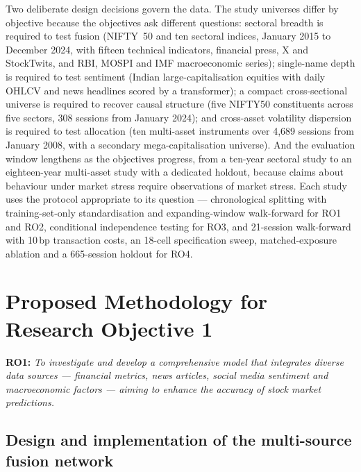 Two deliberate design decisions govern the data. The study universes differ by objective
because the objectives ask different questions: sectoral breadth is required to test fusion
(NIFTY~50 and ten sectoral indices, January 2015 to December 2024, with fifteen technical
indicators, financial press, X and StockTwits, and RBI, MOSPI and IMF macroeconomic series);
single-name depth is required to test sentiment (Indian large-capitalisation equities with
daily OHLCV and news headlines scored by a transformer); a compact cross-sectional universe is
required to recover causal structure (five NIFTY50 constituents across five sectors, 308
sessions from January 2024); and cross-asset volatility dispersion is required to test
allocation (ten multi-asset instruments over 4,689 sessions from January 2008, with a secondary
mega-capitalisation universe). And the evaluation window lengthens as the objectives progress,
from a ten-year sectoral study to an eighteen-year multi-asset study with a dedicated holdout,
because claims about behaviour under market stress require observations of market stress. Each
study uses the protocol appropriate to its question --- chronological splitting with
training-set-only standardisation and expanding-window walk-forward for RO1 and RO2,
conditional independence testing for RO3, and 21-session walk-forward with 10\,bp transaction
costs, an 18-cell specification sweep, matched-exposure ablation and a 665-session holdout for
RO4.

\section{Proposed Methodology for Research Objective 1}

\textbf{RO1:} \emph{To investigate and develop a comprehensive model that integrates diverse
data sources --- financial metrics, news articles, social media sentiment and macroeconomic
factors --- aiming to enhance the accuracy of stock market predictions.}

\subsection{Design and implementation of the multi-source fusion network}

